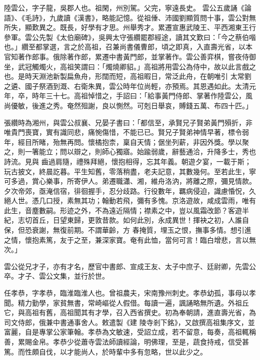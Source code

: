 \begin{pinyinscope}
 陸雲公，字子龍，吳郡人也。祖閑，州別駕。父完，寧遠長史。
 雲公五歲誦《論語》、《毛詩》，九歲讀《漢書》，略能記憶。從祖倕、沛國劉顯質問十事，雲公對無所失，顯歎異之。既長，好學有才思。州舉秀才。累遷宣惠武陵王、平西湘東王行參軍。雲公先製《太伯廟碑》，吳興太守張纘罷郡經途，讀其文歎曰：「今之蔡伯喈也。」纘至都掌選，言之於高祖，召兼尚書儀曹郎，頃之即真，入直壽光省，以本官知著作郎事。俄除著作郎，累遷中書黃門郎，並掌著作。雲公善弈棋，嘗夜侍御坐，武冠觸燭火，高祖笑謂曰：「燭燒卿貂。」高祖將用雲公為侍中，故以此言戲之也。是時天淵池新製扁魚舟，形闊而短，高祖暇日，常泛此舟，在朝唯引
 太常劉之遴、國子祭酒到溉、右衛朱異，雲公時年位尚輕，亦預焉。其恩遇如此。太清元年，卒，時年三十七。高祖悼惜之，手詔曰：「給事黃門侍郎、掌著作陸雲公，風尚優敏，後進之秀。奄然殂謝，良以惻然。可剋日舉哀，賻錢五萬、布四十匹。」



 張纘時為湘州，與雲公叔襄、兄晏子書曰：「都信至，承賢兄子賢弟黃門殞折，非唯貴門喪寶，實有識同悲，痛惋傷惜，不能已已。賢兄子賢弟神情早著，標令弱年，經目所睹，殆無再問。懷橘抱柰，稟自天情；倨坐列薪，非因外獎。學以聚之，則一箸能立；問以辯之，則師心獨寤。始踰弱歲，辭藝通洽，升降多士，秀也詩流。見與
 齒過肩隨，禮殊拜絕，懷抱相得，忘其年義。朝遊夕宴，一載于斯；玩古披文，終晨訖暮。平生知舊，零落稍盡，老夫記意，其數幾何。至若此生，寧可多過，賞心樂事，所寄伊人。弟遷職瀟、湘，維舟洛汭，將離之際，彌見情款。夕次帝郊，亟淹信宿，徘徊握手，忍分歧路。行役數年，羈病侵迫，識慮惛怳，久絕人世。憑几口授，素無其功；翰動若飛，彌有多愧。京洛遊故，咸成雲雨，唯有此生，音塵數嗣。形迹之外，不為遠近隔情；襟素之中，豈以風霜改節？客遊半紀，志切首丘，日望東歸，更敦昔款。如何此別，永成異世！揮袂之初，人誰自保，但恐衰謝，無復前期。不謂華齡，方
 春掩質，埋玉之恨，撫事多情。想引進之情，懷抱素篤，友于之至，兼深家寶。奄有此恤，當何可言！臨白增悲，言以無次。」



 雲公從兄才子，亦有才名，歷官中書郎、宣成王友、太子中庶子、廷尉卿，先雲公卒。才子、雲公文集，並行於世。



 任孝恭，字孝恭，臨淮臨淮人也。曾祖農夫，宋南豫州刺史。孝恭幼孤，事母以孝聞。精力勤學，家貧無書，常崎嶇從人假借。每讀一遍，諷誦略無所遺。外祖丘它，與高祖有舊，高祖聞其有才學，召入西省撰史。初為奉朝請，進直壽光省，為司文侍郎，俄兼中書通事舍人。敕遣製《建
 陵寺剎下銘》，又啟撰高祖集序文，並富麗，自是專掌公家筆翰。孝恭為文敏速，受詔立成，若不留意，每奏，高祖輒稱善，累賜金帛。孝恭少從蕭寺雲法師讀經論，明佛理，至是，蔬食持戒，信受甚篤。而性頗自伐，以才能尚人，於時輩中多有忽略，世以此少之。




\end{pinyinscope}
